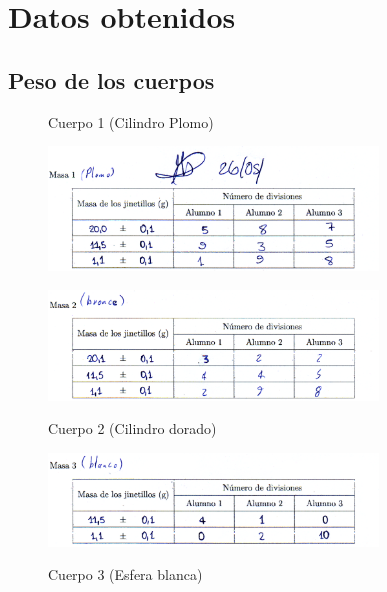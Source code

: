 \documentclass[10pt]{article}
\begin{document}
\section{Datos obtenidos}

\subsection{Peso de los cuerpos}

\begin{figure}[H]
    \begin{center}
        \caption{Cuerpo 1 (Cilindro Plomo)} {\label{fig:plomo}} 
        \includegraphics[width = 0.78\textwidth]{Imagenes/Peso Final 1.png}
    \end{center}

    \vspace{-0.1cm}
    \begin{center}
        \caption{Cuerpo 2 (Cilindro dorado)}  {\label{fig:laton}} 
        \includegraphics[width = 0.78\textwidth]{Imagenes/Peso Final 2.png}
    \end{center}
\end{figure}

\newpage
\begin{figure}[H]
    \begin{center}
        \caption{Cuerpo 3 (Esfera blanca)}  {\label{fig:blanco}} 
        \vspace{-0.3cm}
        \includegraphics[width = 0.78\textwidth]{Imagenes/Peso Final 3.png}
    \end{center}
\end{figure}
\end{document}

